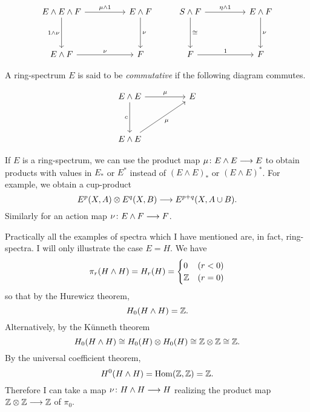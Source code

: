\documentclass[../main]{subfiles}
\begin{document}
\[
\begin{tikzcd}
E \wedge E \wedge F \arrow[dd, "1 \wedge \nu"'] \arrow[rr, "\mu \wedge 1"] &  & E \wedge F \arrow[dd, "\nu"] & S \wedge F \arrow[rr, "\eta \wedge 1"] \arrow[dd, "\cong"] &  & E \wedge F \arrow[dd, "\nu"] \\
                                                                           &  &                              &                                                   &  &                              \\
E \wedge F \arrow[rr, "\nu"]                                               &  & F                            & F \arrow[rr, "1"]                                 &  & F                           
\end{tikzcd}
\]


A ring-spectrum $E$ is said to be \emph{commutative}  if the following diagram commutes.



\[
\begin{tikzcd}
E \wedge E \arrow[rr, "\mu"] \arrow[dd, "c"'] &  & E \\
                                              &  &   \\
E \wedge E \arrow[rruu, "\mu"']               &  &  
\end{tikzcd}
\]


If $E$ is a ring-spectrum, we can use the product map $\mu \colon E \wedge E \longrightarrow E$ to obtain products with values in $E_*$ or $E^*$ instead of $(E \wedge E)_*$ or $(E \wedge E)^*$. For example, we obtain a cup-product 
\[E^p(X,A) \otimes E^q(X,B) \longrightarrow E^{p+q}(X,A \cup B).\]
Similarly for an action map $\nu \colon E \wedge F \longrightarrow F$.

Practically all the examples of spectra which I have mentioned are, in fact, ring-spectra. I will only illustrate the case $E=H$. We have
\[\pi_r (H \wedge H) = H_r(H) = \begin{cases}
    0 & (r < 0) \\
    \mathbb{Z} & (r=0)
\end{cases}\]
so that by the Hurewicz theorem,
\[H_0(H \wedge H) = \mathbb{Z}.\]
Alternatively, by the Künneth theorem
\[H_0(H \wedge H) \cong H_0(H) \otimes H_0(H) \cong \mathbb{Z} \otimes \mathbb{Z} \cong \mathbb{Z}.\]
By the universal coefficient theorem,
\[H^0(H \wedge H) = \operatorname{Hom}(\mathbb{Z},\mathbb{Z}) = \mathbb{Z}.\]
Therefore I can take a map $\nu \colon H \wedge H \longrightarrow H$ realizing the product map $\mathbb{Z} \otimes \mathbb{Z} \longrightarrow \mathbb{Z}$ of $\pi_0$.
\end{document}
